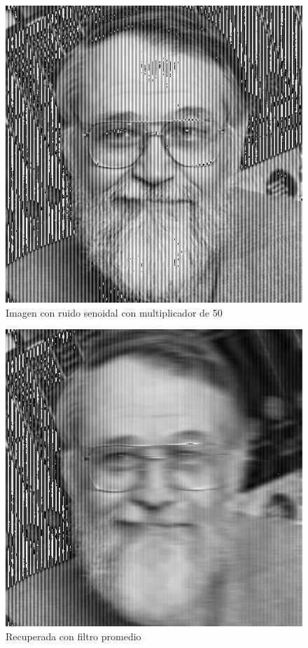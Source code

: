 \begin{figure}[H]
\begin {center}
\includegraphics[width=360pt]{imagenes/kern-sin50-noisy.png}
\end {center}
\caption{Imagen con ruido senoidal con multiplicador de 50}
\label{fig:SinProm}
\end{figure}

\begin{figure}[H]
\begin {center}
\includegraphics[width=360pt]{imagenes/kern-sin50-recovered-avg.png}
\end {center}
\caption{Recuperada con filtro promedio}
\label{fig:SinProm}
\end{figure}

